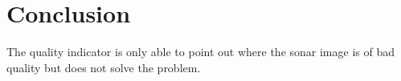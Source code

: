 \chapter{Conclusion}

The quality indicator is only able to point out where the sonar image is of bad quality but does not solve the problem.